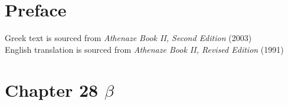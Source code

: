 \documentclass{article}
\begin{document}
\section{Preface}

Greek text is sourced from \emph{Athenaze Book II, Second Edition} (2003) \\
English translation is sourced from \emph{Athenaze Book II, Revised Edition} (1991)

\section{Chapter 28 $\beta$}
\end{document}
